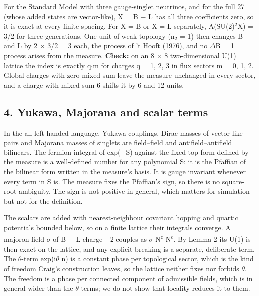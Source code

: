 \documentclass[
]{article}
\begin{document}
For the Standard Model with three gauge-singlet neutrinos, and for the
full 27 (whose added states are vector-like), X = B \ensuremath{-} L has all three
coefficients zero, so it is exact at every finite spacing. For X = B or
X = L separately, A(SU(2)\ensuremath{^{2}}X) = 3/2 for three generations. One unit of
weak topology (n\ensuremath{_{2}} = 1) then changes B and L by 2 \ensuremath{\times} 3/2 = 3 each, the
process of 't Hooft (1976), and no \ensuremath{\Delta}B = 1 process arises from the
measure. \textbf{Check:} on an 8 \ensuremath{\times} 8 two-dimensional U(1) lattice the
index is exactly q\ensuremath{\cdot}m for charges q = 1, 2, 3 in flux sectors m = 0, 1,
2. Global charges with zero mixed sum leave the measure unchanged in
every sector, and a charge with mixed sum 6 shifts it by 6 and 12 units.

\hypertarget{yukawa-majorana-and-scalar-terms}{%
\subsection{4. Yukawa, Majorana and scalar
terms}\label{yukawa-majorana-and-scalar-terms}}

In the all-left-handed language, Yukawa couplings, Dirac masses of
vector-like pairs and Majorana masses of singlets are field--field and
antifield--antifield bilinears. The fermion integral of exp(\ensuremath{-}S) against
the fixed top form defined by the measure is a well-defined number for
any polynomial S: it is the Pfaffian of the bilinear form written in the
measure's basis. It is gauge invariant whenever every term in S is. The
measure fixes the Pfaffian's sign, so there is no square-root ambiguity.
The sign is not positive in general, which matters for simulation but
not for the definition.

The scalars are added with nearest-neighbour covariant hopping and
quartic potentials bounded below, so on a finite lattice their integrals
converge. A majoron field \ensuremath{\sigma} of B \ensuremath{-} L charge \ensuremath{-}2 couples as \ensuremath{\sigma}
N\textsuperscript{c} N\textsuperscript{c}. By Lemma 2 its U(1) is then
exact on the lattice, and any explicit breaking is a separate,
deliberate term. The \ensuremath{\theta}-term exp(i\ensuremath{\theta} n) is a constant phase per
topological sector, which is the kind of freedom Craig's construction
leaves, so the lattice neither fixes nor forbids \ensuremath{\theta}. The freedom is a
phase per connected component of admissible fields, which is in general
wider than the \ensuremath{\theta}-terms; we do not show that locality reduces it to them.
\end{document}
